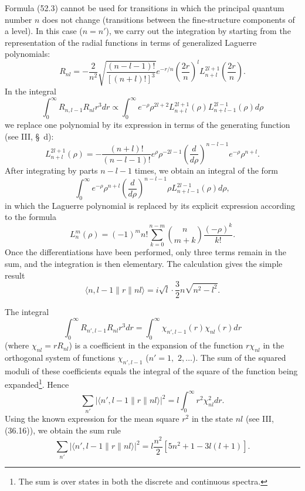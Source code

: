 Formula (52.3) cannot be used for transitions in which the principal quantum number $n$ does not change (transitions between the fine-structure components of a level). In this case ($n=n'$), we carry out the integration by starting from the representation of the radial functions in terms of generalized Laguerre polynomials:
\begin{equation}
R_{nl}=-\frac2{n^2}\sqrt{\frac{(n-l-1)!}{[(n+l)!]^3}}
e^{-r/n}\left(\frac{2r}{n}\right)^l
L_{n+l}^{2l+1}\left(\frac{2r}{n}\right).
\tag{52.5}
\end{equation}
In the integral
\[
\int_0^\infty R_{n,l-1}R_{nl}r^3dr
\propto\int_0^\infty e^{-\rho}\rho^{2l+2}
L_{n+l}^{2l+1}(\rho)L_{n+l-1}^{2l-1}(\rho)d\rho
\]
we replace one polynomial by its expression in terms of the generating function (see III, \S~d):
\[
L_{n+l}^{2l+1}(\rho)
=-\frac{(n+l)!}{(n-l-1)!}e^\rho\rho^{-2l-1}
\left(\frac d{d\rho}\right)^{n-l-1}e^{-\rho}\rho^{n+l}.
\]
After integrating by parts $n-l-1$ times, we obtain an integral of the form
\[
\int_0^\infty e^{-\rho}\rho^{n+l}
\left(\frac d{d\rho}\right)^{n-l-1}
\rho L_{n+l-1}^{2l-1}(\rho)d\rho,
\]
in which the Laguerre polynomial is replaced by its explicit expression according to the formula
\[
L_n^m(\rho)=(-1)^mn!\sum_{k=0}^{n-m}
\binom n{m+k}\frac{(-\rho)^k}{k!}.
\]
Once the differentiations have been performed, only three terms remain in the sum, and the integration is then elementary. The calculation gives the simple result
\begin{equation}
\langle n,l-1\|r\|nl\rangle=i\sqrt l\cdot\frac32n\sqrt{n^2-l^2}.
\tag{52.6}
\end{equation}

The integral
\[
\int_0^\infty R_{n',l-1}R_{nl}r^3dr
=\int_0^\infty\chi_{n',l-1}(r)\chi_{nl}(r)dr
\]
(where $\chi_{nl}=rR_{nl}$) is a coefficient in the expansion of the function $r\chi_{nl}$ in the orthogonal system of functions $\chi_{n',l-1}$ ($n'=1,$
$2,\ldots$). The sum of the squared moduli of these coefficients equals the integral of the square of the function being expanded\footnote{The sum is over states in both the discrete and continuous spectra.}. Hence
\begin{equation}
\sum_{n'}|\langle n',l-1\|r\|nl\rangle|^2
=l\int_0^\infty r^2\chi_{nl}^2dr.
\tag{52.7}
\end{equation}
Using the known expression for the mean square $r^2$ in the state $nl$ (see III, (36.16)), we obtain the sum rule
\begin{equation}
\sum_{n'}|\langle n',l-1\|r\|nl\rangle|^2
=l\frac{n^2}{2}[5n^2+1-3l(l+1)].
\tag{52.8}
\end{equation}

